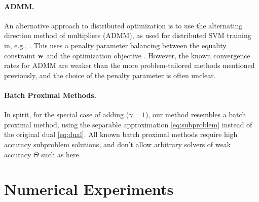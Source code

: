 \documentclass{article}
\newcommand{\wv}{ {\bf w}}
\newcommand{\0}{ {\bf 0}}
\theoremstyle{plain}
\theoremstyle{definition}
\begin{document}
{%

\vspace{-1em}
\paragraph{ADMM.}
An alternative approach to distributed optimization is to use the alternating direction method of multipliers (ADMM), as used for distributed SVM training in, e.g., \cite{Forero:2010vv}. This uses a penalty parameter balancing between the equality constraint $\wv$ and the optimization objective \cite{boyd2011distributed}. However, the known convergence rates for ADMM are weaker than the more problem-tailored methods mentioned previously, and the choice of the  penalty parameter is often unclear.

\vspace{-1em}
\paragraph{Batch Proximal Methods.}
In spirit, for the special case of adding ($\gamma=1$), our method resembles a batch proximal method, using the separable approximation \eqref{eq:subproblem} instead of the original dual \eqref{eq:dual}. All known batch proximal methods require high accuracy subproblem solutions, and don't allow arbitrary solvers of weak accuracy $\Theta$ such as here.





\section{Numerical Experiments}
\label{sec:experiments}


}
\end{document}
